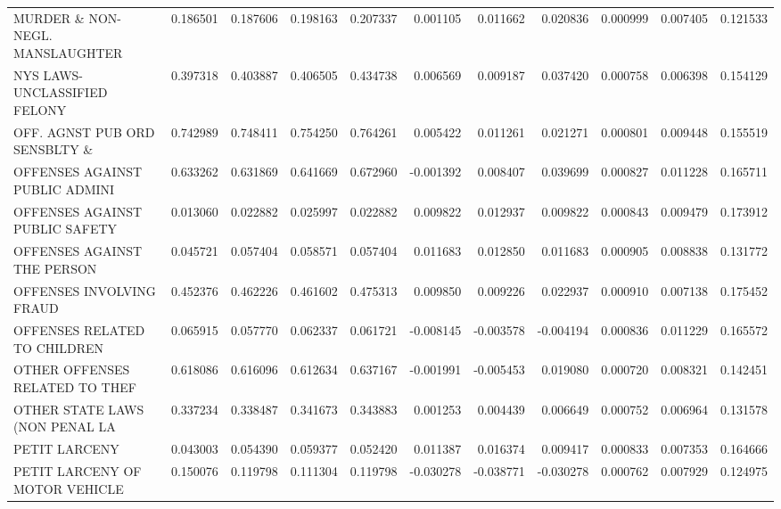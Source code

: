 \begin{tabular}{lrrrrrrrrrr}
MURDER \& NON-NEGL. MANSLAUGHTER &     0.186501 &  0.187606 &   0.198163 &   0.207337 &     0.001105 &        0.011662 &        0.020836 &  0.000999 &     0.007405 &     0.121533 \\
NYS LAWS-UNCLASSIFIED FELONY    &     0.397318 &  0.403887 &   0.406505 &   0.434738 &     0.006569 &        0.009187 &        0.037420 &  0.000758 &     0.006398 &     0.154129 \\
OFF. AGNST PUB ORD SENSBLTY \&   &     0.742989 &  0.748411 &   0.754250 &   0.764261 &     0.005422 &        0.011261 &        0.021271 &  0.000801 &     0.009448 &     0.155519 \\
OFFENSES AGAINST PUBLIC ADMINI  &     0.633262 &  0.631869 &   0.641669 &   0.672960 &    -0.001392 &        0.008407 &        0.039699 &  0.000827 &     0.011228 &     0.165711 \\
OFFENSES AGAINST PUBLIC SAFETY  &     0.013060 &  0.022882 &   0.025997 &   0.022882 &     0.009822 &        0.012937 &        0.009822 &  0.000843 &     0.009479 &     0.173912 \\
OFFENSES AGAINST THE PERSON     &     0.045721 &  0.057404 &   0.058571 &   0.057404 &     0.011683 &        0.012850 &        0.011683 &  0.000905 &     0.008838 &     0.131772 \\
OFFENSES INVOLVING FRAUD        &     0.452376 &  0.462226 &   0.461602 &   0.475313 &     0.009850 &        0.009226 &        0.022937 &  0.000910 &     0.007138 &     0.175452 \\
OFFENSES RELATED TO CHILDREN    &     0.065915 &  0.057770 &   0.062337 &   0.061721 &    -0.008145 &       -0.003578 &       -0.004194 &  0.000836 &     0.011229 &     0.165572 \\
OTHER OFFENSES RELATED TO THEF  &     0.618086 &  0.616096 &   0.612634 &   0.637167 &    -0.001991 &       -0.005453 &        0.019080 &  0.000720 &     0.008321 &     0.142451 \\
OTHER STATE LAWS (NON PENAL LA  &     0.337234 &  0.338487 &   0.341673 &   0.343883 &     0.001253 &        0.004439 &        0.006649 &  0.000752 &     0.006964 &     0.131578 \\
PETIT LARCENY                   &     0.043003 &  0.054390 &   0.059377 &   0.052420 &     0.011387 &        0.016374 &        0.009417 &  0.000833 &     0.007353 &     0.164666 \\
PETIT LARCENY OF MOTOR VEHICLE  &     0.150076 &  0.119798 &   0.111304 &   0.119798 &    -0.030278 &       -0.038771 &       -0.030278 &  0.000762 &     0.007929 &     0.124975 \\

\end{tabular}
